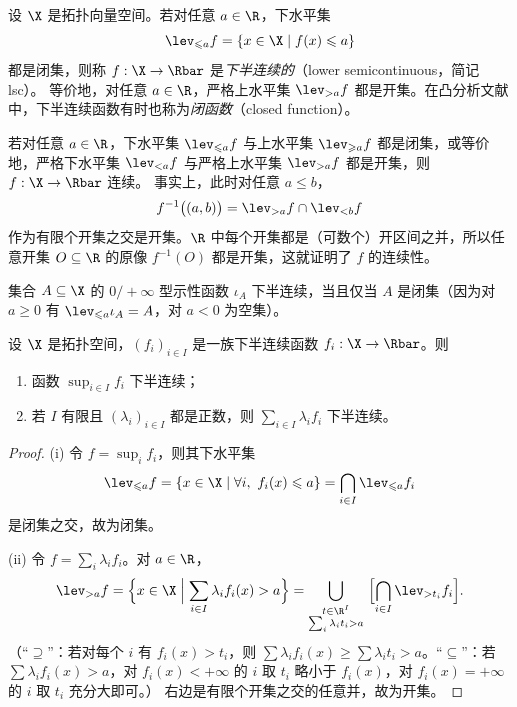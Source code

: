 \begin{definition}[下半连续]
\label{def:15}
设 $\X$ 是拓扑向量空间。若对任意 $a\in\R$，下水平集
\[
  \lev_{\leqslant a}f=\{x\in\X \mid f(x)\leqslant a\}
\]
都是闭集，则称 $f:\X\to\Rbar$ 是\emph{下半连续的}（lower semicontinuous，简记 lsc）。
等价地，对任意 $a\in\R$，严格上水平集 $\lev_{>a}f$ 都是开集。在凸分析文献中，下半连续函数有时也称为\emph{闭函数}（closed function）。
\end{definition}

\begin{remark}[与连续性的关系]
\label{rem:7}
若对任意 $a\in\R$，下水平集 $\lev_{\leqslant a}f$ 与上水平集 $\lev_{\geqslant a}f$ 都是闭集，或等价地，严格下水平集 $\lev_{<a}f$ 与严格上水平集 $\lev_{>a}f$ 都是开集，则 $f:\X\to\Rbar$ 连续。
事实上，此时对任意 $a\leqslant b$，
\[
  f^{-1}\bigl((a,b)\bigr)=\lev_{>a}f\cap\lev_{<b}f
\]
作为有限个开集之交是开集。$\R$ 中每个开集都是（可数个）开区间之并，所以任意开集 $O\subseteq\R$ 的原像 $f^{-1}(O)$ 都是开集，这就证明了 $f$ 的连续性。
\end{remark}

\begin{example}[示性函数]
\label{exa:7}
集合 $A\subseteq\X$ 的 $0/+\infty$ 型示性函数 $\iota_A$ 下半连续，当且仅当 $A$ 是闭集（因为对 $a\geqslant0$ 有 $\lev_{\leqslant a}\iota_A=A$，对 $a<0$ 为空集）。
\end{example}

\begin{proposition}
\label{res:23}
设 $\X$ 是拓扑空间，$(f_i)_{i\in I}$ 是一族下半连续函数 $f_i:\X\to\Rbar$。则
\begin{enumerate}[label=(\roman*)]
  \item 函数 $\sup_{i\in I}f_i$ 下半连续；
  \item 若 $I$ 有限且 $(\lambda_i)_{i\in I}$ 都是正数，则 $\sum_{i\in I}\lambda_if_i$ 下半连续。
\end{enumerate}
\end{proposition}

\begin{proof}
(i) 令 $f=\sup_{i}f_i$，则其下水平集
\[
  \lev_{\leqslant a}f=\{x\in\X \mid \forall i,\ f_i(x)\leqslant a\}=\bigcap_{i\in I}\lev_{\leqslant a}f_i
\]
是闭集之交，故为闭集。

(ii) 令 $f=\sum_i\lambda_if_i$。对 $a\in\R$，
\[
  \lev_{>a}f=\Bigl\{x\in\X \Bigm| \sum_{i\in I}\lambda_if_i(x)>a\Bigr\}
  =\bigcup_{\substack{t\in\R^I\\ \sum_i\lambda_it_i>a}}\ \Bigl[\bigcap_{i\in I}\lev_{>t_i}f_i\Bigr].
\]
（“$\supseteq$”：若对每个 $i$ 有 $f_i(x)>t_i$，则 $\sum\lambda_if_i(x)\geqslant\sum\lambda_it_i>a$。“$\subseteq$”：若 $\sum\lambda_if_i(x)>a$，对 $f_i(x)<+\infty$ 的 $i$ 取 $t_i$ 略小于 $f_i(x)$，对 $f_i(x)=+\infty$ 的 $i$ 取 $t_i$ 充分大即可。）
右边是有限个开集之交的任意并，故为开集。
\end{proof}

